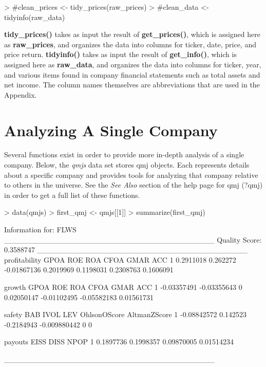 \documentclass[titlepage]{article}
\begin{document}
\begin{Schunk}
\begin{Sinput}
> #clean_prices <- tidy_prices(raw_prices)
> #clean_data <- tidyinfo(raw_data)
\end{Sinput}
\end{Schunk}

\textbf{tidy\_prices()} takes as input the result of \textbf{get\_prices()}, which is assigned here as \textbf{raw\_prices}, and organizes the data into columns for ticker, date, price, and price return. \textbf{tidyinfo()} takes as input the result of \textbf{get\_info()}, which is assigned here as \textbf{raw\_data}, and organizes the data into columns for ticker, year, and various items found in company financial statements such as total assets and net income. The column names themselves are abbreviations that are used in the Appendix. 

\section*{Analyzing A Single Company}
Several functions exist in order to provide more in-depth analysis of a single company. Below, the \textit{qmjs} data set stores qmj objects. Each represents details about a specific company and provides tools for analyzing that company relative to others in the universe. See the \textit{See Also} section of the help page for qmj (?qmj) in order to get a full list of these functions.

\begin{Schunk}
\begin{Sinput}
> data(qmjs)
> first_qmj <- qmjs[[1]]
> summarize(first_qmj) 
\end{Sinput}
\begin{Soutput}
Information for:  FLWS
_______________________________________
Quality Score:  0.3588747
_______________________________________
  profitability     GPOA         ROE       ROA      CFOA      GMAR       ACC
1     0.2911018 0.262272 -0.01867136 0.2019969 0.1198031 0.2308763 0.1606091


       growth        GPOA ROE        ROA        CFOA        GMAR        ACC
1 -0.03357491 -0.03355643   0 0.02050147 -0.01102495 -0.05582183 0.01561731


       safety      BAB       IVOL          LEV OhlsonOScore AltmanZScore
1 -0.08842572 0.142523 -0.2184943 -0.009880442            0            0


    payouts      EISS       DISS       NPOP
1 0.1897736 0.1998357 0.09870005 0.01514234

_______________________________________
\end{Soutput}
\end{Schunk}
\end{document}
